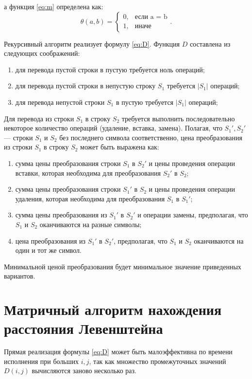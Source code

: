 а функция \ref{eq:m} определена как:
\begin{equation}
	\label{eq:m}
	\theta(a, b) = \begin{cases}
		0, &\text{если a = b}\\
		1, &\text{иначе}
	\end{cases}.
\end{equation}


Рекурсивный алгоритм реализует формулу \ref{eq:D}.
Функция $D$ составлена из следующих соображений:
\begin{enumerate}[label={\arabic*)}]
	\item для перевода пустой строки в пустую требуется ноль операций;
	\item для перевода пустой строки в непустую строку $S_1$ требуется $|S_1|$ операций;
	\item для перевода непустой строки $S_1$ в пустую требуется $|S_1|$ операций;
\end{enumerate}
Для перевода из строки $S_1$ в строку $S_2$ требуется выполнить последовательно некоторое количество операций (удаление, вставка, замена). Полагая, что $S_1', S_2'$  — строки $S_1$ и $S_2$ без последнего символа соответственно, цена преобразования из строки $S_1$ в строку $S_2$ может быть выражена как:
	\begin{enumerate}[label={\arabic*)}]
		\item сумма цены преобразования строки $S_1$ в $S_2'$  и цены проведения операции вставки, которая необходима для преобразования $S_2'$ в $S_2$;
		\item сумма цены преобразования строки $S_1'$ в $S_2$ и цены проведения операции удаления, которая необходима для преобразования $S_1$ в $S_1'$;
		\item сумма цены преобразования из $S_1'$ в $S_2'$ и операции замены, предполагая, что $S_1$ и $S_2$ оканчиваются на разные символы;
		\item цена преобразования из $S_1'$ в $S_2'$, предполагая, что $S_1$ и $S_2$ оканчиваются на один и тот же символ.
	\end{enumerate}
Минимальной ценой преобразования будет минимальное значение приведенных вариантов.

\section{Матричный алгоритм нахождения расстояния Левенштейна}

Прямая реализация формулы \ref{eq:D} может быть малоэффективна по времени исполнения при больших $i, j$, так как множество промежуточных значений $D(i, j)$ вычисляются заново несколько раз. 

